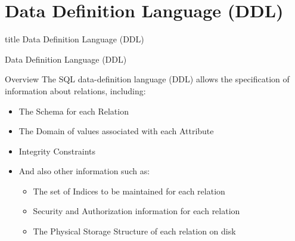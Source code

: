 \documentclass[aspectratio=169, xcolor=dvipsnames]{beamer}
\begin{document}
\section{Data Definition Language (DDL)}

\begin{frame}
  \vfill
  \centering
  \begin{beamercolorbox}[sep=8pt,center,shadow=true,rounded=true]{title}
    Data Definition Language (DDL)\par%
  \end{beamercolorbox}
  \vfill
\end{frame}

\begin{frame}{Data Definition Language (DDL)}
    \begin{block}{Overview}
        The SQL data-definition language (DDL) allows the specification of information about relations, including:
        \begin{itemize}[<+->]
            \item The Schema for each Relation
            \item The Domain of values associated with each Attribute
            \item Integrity Constraints
            \item And also other information such as:
            \begin{itemize}
                \item The set of Indices to be maintained for each relation
                \item Security and Authorization information for each relation
                \item The Physical Storage Structure of each relation on disk
            \end{itemize}
        \end{itemize}
    \end{block}
\end{frame}
\end{document}
